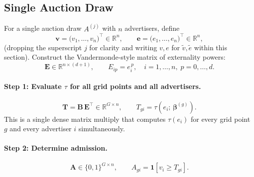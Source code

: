 \documentclass[11pt]{article}
\newcommand{\bsbeta}{\boldsymbol{\beta}}
\begin{document}
\subsection{Single Auction Draw}

For a single auction draw $A^{(j)}$ with $n$ advertisers, define
\begin{equation}
    \mathbf{v} = \bigl(v_1,\ldots,v_n\bigr)^{\!\top} \in \mathbb{R}^n, \qquad
    \mathbf{e} = \bigl(e_1,\ldots,e_n\bigr)^{\!\top} \in \mathbb{R}^n,
\end{equation}
(dropping the superscript $j$ for clarity and writing $v, e$ for
$\tilde{v}, \tilde{e}$ within this section).
Construct the Vandermonde-style matrix of externality powers:
\begin{equation}
    \mathbf{E} \in \mathbb{R}^{n \times (d+1)}, \qquad
    E_{ip} = e_i^{\,p}, \quad i = 1,\ldots,n,\; p = 0,\ldots,d.
\end{equation}

\paragraph{Step 1: Evaluate $\tau$ for all grid points and all advertisers.}
\begin{equation}
    \mathbf{T} = \mathbf{B}\,\mathbf{E}^{\!\top} \in \mathbb{R}^{G \times n},
    \qquad T_{gi} = \tau(e_i;\,\bsbeta^{(g)}).
    \label{eq:tau_matrix}
\end{equation}
This is a single dense matrix multiply that computes $\tau(e_i)$ for every
grid point $g$ and every advertiser $i$ simultaneously.

\paragraph{Step 2: Determine admission.}
\begin{equation}
    \mathbf{A} \in \{0,1\}^{G \times n}, \qquad
    A_{gi} = \mathbf{1}[v_i \geq T_{gi}].
    \label{eq:admission}
\end{equation}
\end{document}
